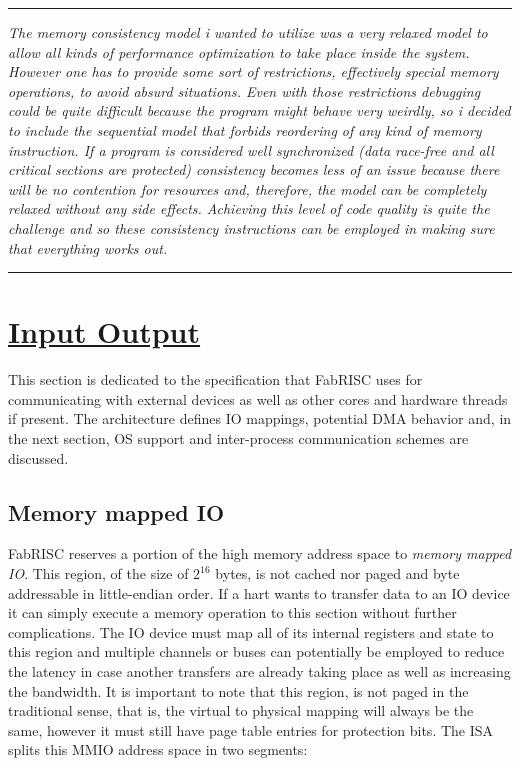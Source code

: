 \documentclass{article}
\begin{document}
        \par\noindent\rule{\textwidth}{0.4pt}
        \textit{The memory consistency model i wanted to utilize was a very relaxed model to allow all kinds of performance optimization to take place inside the system. However one has to provide some sort of restrictions, effectively special memory operations, to avoid absurd situations. Even with those restrictions debugging could be quite difficult because the program might behave very weirdly, so i decided to include the sequential model that forbids reordering of any kind of memory instruction. If a program is considered well synchronized (data race-free and all critical sections are protected) consistency becomes less of an issue because there will be no contention for resources and, therefore, the model can be completely relaxed without any side effects. Achieving this level of code quality is quite the challenge and so these consistency instructions can be employed in making sure that everything works out.}
        \par\noindent\rule{\textwidth}{0.4pt}

    \clearpage


    \section[Input Output]{\LARGE\underline{Input Output}} %

        \vspace{10pt}

        This section is dedicated to the specification that FabRISC uses for communicating with external devices as well as other cores and hardware threads if present. The architecture defines IO mappings, potential DMA behavior and, in the next section, OS support and inter-process communication schemes are discussed.

        \subsection{Memory mapped IO}

            \vspace{10pt}

            FabRISC reserves a portion of the high memory address space to \textit{memory mapped IO}. This region, of the size of $2^{16}$ bytes, is not cached nor paged and byte addressable in little-endian order. If a hart wants to transfer data to an IO device it can simply execute a memory operation to this section without further complications. The IO device must map all of its internal registers and state to this region and multiple channels or buses can potentially be employed to reduce the latency in case another transfers are already taking place as well as increasing the bandwidth. It is important to note that this region, is not paged in the traditional sense, that is, the virtual to physical mapping will always be the same, however it must still have page table entries for protection bits. The ISA splits this MMIO address space in two segments:
\end{document}
